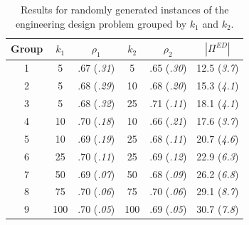 \documentclass{article}
\theoremstyle{definition}
\numberwithin{equation}{section}
\begin{document}
\begin{table}[!ht]
\centering
\begin{tabular}{||c c c c c c||} 
 \hline
 Group & $k_1$ & $\rho_1$ & $k_2$ & $\rho_2$ & $|\Pi^{ED}|$ \\ [0.5ex] 
 \hline\hline
 1 & 5 & .67 (\textit{.31}) & 5 & .65 (\textit{.30}) & 12.5 (\textit{3.7}) \\
 2 & 5 & .68 (\textit{.29}) & 10 & .68 (\textit{.20}) & 15.3 (\textit{4.1}) \\
 3 & 5 & .68 (\textit{.32}) & 25 & .71 (\textit{.11}) &  18.1 (\textit{4.1}) \\
 4 & 10 & .70 (\textit{.18}) & 10 & .66 (\textit{.21}) &  17.6 (\textit{3.7}) \\
 5 & 10 & .69 (\textit{.19}) & 25 & .68 (\textit{.11}) &  20.7 (\textit{4.6}) \\
 6 & 25 & .70 (\textit{.11}) & 25 & .69 (\textit{.12}) &  22.9 (\textit{6.3}) \\
 7 & 50 & .69 (\textit{.07}) & 50 & .68 (\textit{.09}) &  26.2 (\textit{6.8}) \\
 8 & 75 & .70 (\textit{.06}) & 75 & .70 (\textit{.06}) & 29.1 (\textit{8.7}) \\
 9 & 100 & .70 (\textit{.05}) & 100 & .69 (\textit{.05}) & 30.7 (\textit{7.8}) \\ [1ex]
 \hline
\end{tabular}
\caption{Results for randomly generated instances of the engineering design problem grouped by $k_1$ and $k_2$.}
\label{table:1}
\end{table}
\end{document}
